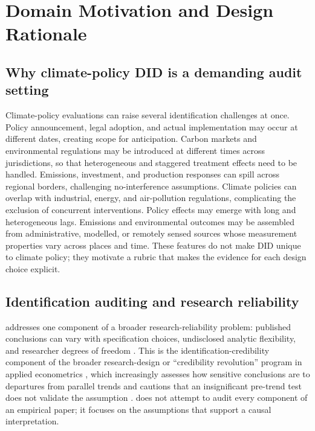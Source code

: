 \section{Domain Motivation and Design Rationale}
\label{app:motivation}

\subsection{Why climate-policy DID is a demanding audit setting}
Climate-policy evaluations can raise several identification challenges at
once. Policy announcement, legal adoption, and actual implementation may occur
at different dates, creating scope for anticipation. Carbon markets and
environmental regulations may be introduced at different times across
jurisdictions, so that heterogeneous and staggered treatment effects need to
be handled. Emissions, investment, and production responses can spill across
regional borders, challenging no-interference assumptions. Climate policies
can overlap with industrial, energy, and air-pollution regulations,
complicating the exclusion of concurrent interventions. Policy effects may
emerge with long and heterogeneous lags. Emissions and environmental outcomes
may be assembled from administrative, modelled, or remotely sensed sources whose
measurement properties vary across places and time. These features do not make
DID unique to climate policy; they motivate a rubric that makes the evidence
for each design choice explicit.

\subsection{Identification auditing and research reliability}
\sys{} addresses one component of a broader research-reliability problem: published
conclusions can vary with specification choices, undisclosed analytic flexibility,
and researcher degrees of freedom
\cite{leamer1983,ioannidis2005,simmons2011,gelmanloken2014,silberzahn2018many,brodeur2020methods,botviniknezer2020variability}.
This is the identification-credibility component of the broader research-design or
``credibility revolution'' program in applied econometrics
\cite{angristpischke2010,atheyimbens2017}, which increasingly assesses how sensitive
conclusions are to departures from parallel trends and cautions that an
insignificant pre-trend test does not validate the assumption
\cite{rambachanroth2023,roth2022}. \sys{} does not attempt to audit every component
of an empirical paper; it focuses on the assumptions that support a causal
interpretation.


